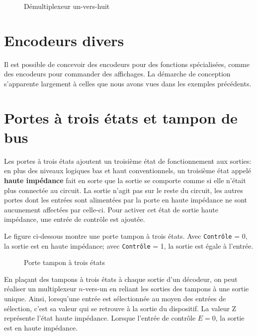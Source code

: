 \documentclass[letter, oneside]{book}
\begin{document}
\begin{figure}[htbp]
\centering

\caption{\label{fig:org9e3c909}Démultiplexeur un-vers-huit}
\end{figure}

\section{Encodeurs divers}
\label{sec:orgfb9ec01}

Il est possible de concevoir des encodeurs pour des fonctions
spécialisées, comme des encodeurs pour commander des affichages. La
démarche de conception s'apparente largement à celles que nous avons
vues dans les exemples précédents.


\section{Portes à trois états et tampon de bus}
\label{sec:org1fde717}

Les portes à trois états ajoutent un troisième état de fonctionnement
aux sorties: en plus des niveaux logiques bas et haut conventionnels,
un troisième état appelé \textbf{haute impédance} fait en sorte que la sortie
se comporte comme si elle n'était plus connectée au circuit. La sortie
n'agit pas sur le reste du circuit, les autres portes dont les entrées
sont alimentées par la porte en haute impédance ne sont aucunement
affectées par celle-ci. Pour activer cet état de sortie
haute impédance, une entrée de contrôle est ajoutée.


Le figure ci-dessous montre une porte tampon à trois états. Avec
\texttt{Contrôle} = 0, la sortie est en haute impédance; avec  \texttt{Contrôle} = 1,
la sortie est égale à l'entrée.

\begin{figure}[htbp]
\centering

\caption{\label{fig:orgdc087c6}Porte tampon à trois états}
\end{figure}

En plaçant des tampons à trois états à chaque sortie d'un décodeur, on
peut réaliser un multiplexeur \(n\)-vers-un en reliant les sorties des
tampons à une sortie unique. Ainsi, lorsqu'une entrée est
sélectionnée au moyen des entrées de sélection, c'est sa valeur qui se
retrouve à la sortie du dispositif. La valeur Z représente l'état
haute impédance.  Lorsque l'entrée de contrôle \(E = 0\), la sortie est
en haute impédance.
\end{document}
